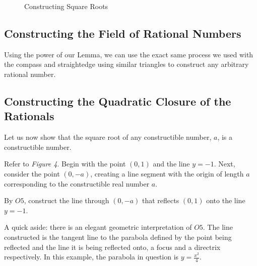 \documentclass[]{article}
\begin{document}
   \begin{figure}[t]
   	\centering
   	\caption{Constructing Square Roots} \label{figure 4}
   \end{figure}
  \subsection{Constructing the Field of Rational Numbers}
  Using the power of our Lemma, we can use the exact same process we used with the compass and straightedge using similar triangles to construct any arbitrary rational number.
  
  \subsection{Constructing the Quadratic Closure of the Rationals}
  Let us now show that the square root of any constructible number, $a$, is a constructible number.
  
  Refer to \emph{Figure 4}. Begin with the point $(0,1)$ and the line $y=-1$. Next, consider the point $(0,-a)$, creating a line segment with the origin of length $a$ corresponding to the constructible real number $a$.
  
  By $O5$, construct the line through $(0,-a)$ that reflects $(0,1)$ onto the line $y=-1$.
  
  A quick aside: there is an elegant geometric interpretation of $O5$. The line constructed is the tangent line to the parabola defined by the point being reflected and the line it is being reflected onto, a focus and a directrix respectively. In this example, the parabola in question is $y=\frac{x^2}{4}$.
  
\end{document}

